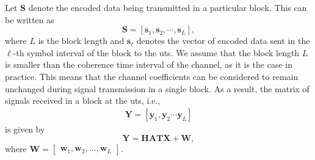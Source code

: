 \documentclass[12pt,draftclsnofoot,onecolumn,journal]{IEEEtran}
\begin{document}
Let $\mathbf S$ denote the encoded data being transmitted in a particular block. This can be written as 
\begin{equation}
	\mathbf S=\left[ \mathbf s_1, \mathbf s_2, \cdots,  \mathbf s_L\right] ,
\end{equation}
where $L$ is the block length and $\mathbf{s}_\ell$ denotes the vector of encoded data sent in the $\ell$-th symbol interval of the block to the \acp{ut}. %
We assume that the block length $L$ is smaller than the coherence time interval of the channel, as it is the case in practice. This means that the channel coefficients can be considered to remain unchanged during signal transmission in a single block. As a result, the matrix of signals received in a block at the \acp{ut}, i.e., 
\begin{align}
	\mathbf Y=\left[ \mathbf y_1, \mathbf y_2 \cdots  \mathbf y_L\right]
\end{align}
is given by
 \begin{equation}
	\mathbf Y=\mathbf{H} \mathbf{A} \mathbf{T} \mathbf{X}+\mathbf{W}, 
\end{equation}
where $\mathbf{W}=\begin{bmatrix}\mathbf w_1, \mathbf w_2, \dots, \mathbf w_L\end{bmatrix}$. %
\end{document}
